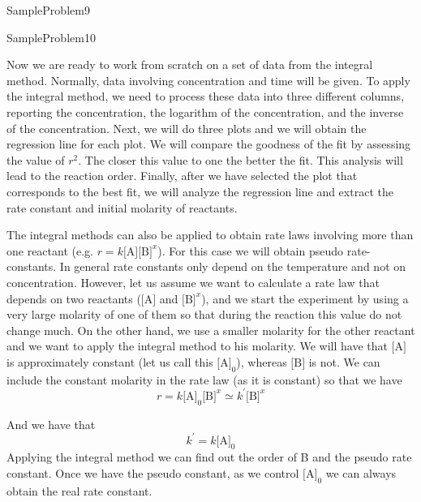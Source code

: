 \documentclass[main.tex]{subfiles}
\begin{document}
\begin{description}
  {SampleProblem9}



  {SampleProblem10}



\item[\docfilehook{The integral method in action}{}] 
Now we are ready to work from scratch on a set of data from the integral method. Normally, data involving concentration and time will be given. To apply the integral method, we need to process these data into three different columns, reporting the concentration, the logarithm of the concentration, and the inverse of the concentration. Next, we will do three plots and we will obtain the regression line for each plot. We will compare the goodness of the fit by assessing the value of $r^2$. The closer this value to one the better the fit. This analysis will lead to the reaction order. Finally, after we have selected the plot that corresponds to the best fit, we will analyze the regression line and extract the rate constant and initial molarity of reactants. 

\item[\docfilehook{The integral method for more than one reactant}{}] 
The integral methods can also be applied to obtain rate laws involving more than one reactant (e.g. $r=k\text{[A]}\text{[B]}^x$). For this case we will obtain pseudo rate-constants. In general rate constants only depend on the temperature and not on concentration. However, let us assume we want to calculate a rate law that depends on two reactants ($\text{[A]}$ and $\text{[B]}^x$), and we start the experiment by using a very large molarity of one of them so that during the reaction this value do not change much. On the other hand, we use a smaller molarity for the other  reactant and we want to apply the integral method to his molarity. We will have that $\text{[A]}$ is approximately constant (let us call this $\text{[A]}_0$), whereas $\text{[B]}$ is not. We can include the constant molarity in the rate law (as it is constant) so that we have 
\[r=k\text{[A]}_0\text{[B]}^x \simeq k^\prime \text{[B]}^x\]
\end{description}
And we have that 
\[ k^\prime=k\text{[A]}_0\]
Applying the integral method we can find out the order of B and the pseudo rate constant. Once we have the pseudo constant, as we control $\text{[A]}_0$ we can always obtain the real rate constant.
\end{document}
